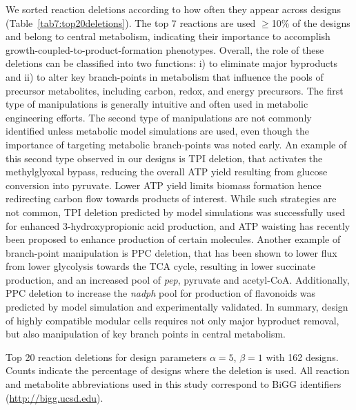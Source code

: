 {We sorted reaction deletions according to how often they appear across designs (Table~\ref{tab7:top20deletions}).
The top 7 reactions are used $\ge$10\% of the designs and belong to central metabolism, indicating their importance to accomplish growth-coupled-to-product-formation phenotypes.
Overall, the role of these deletions can be classified into two functions: i) to eliminate major byproducts and ii) to alter key branch-points in metabolism that influence the pools of precursor metabolites, including carbon, redox, and energy precursors.
The first type of manipulations is generally intuitive and often used in metabolic engineering efforts.\citep{winkler2015}
The second type of manipulations are not commonly identified unless metabolic model simulations are used, \citep{tokuyama2014, venayak2018, chemler2010}
even though the importance of targeting metabolic branch-points was noted early.\citep{stephanopoulos1991}
An example of this second type observed in our designs is TPI deletion, that activates the methylglyoxal bypass,\citep{fong2006} reducing the overall ATP yield resulting from glucose conversion into pyruvate.
Lower ATP yield limits biomass formation hence redirecting carbon flow towards products of interest.
While such strategies are not common, TPI deletion predicted by model simulations was successfully used for enhanced 3-hydroxypropionic acid production,\citep{tokuyama2014} and ATP waisting has recently been proposed to enhance production of certain molecules.\citep{boecker2019}
Another example of branch-point manipulation is PPC deletion, that has been shown to lower flux from lower glycolysis towards the TCA cycle,\citep{de2006,peng2004} resulting in lower succinate production, and an increased pool of \textit{pep}, pyruvate and acetyl-CoA.
Additionally, PPC deletion to increase the \textit{nadph} pool for production of flavonoids was predicted by model simulation and experimentally validated.\citep{chemler2010}
In summary, design of highly compatible modular cells requires not only major byproduct removal, but also manipulation of key branch points in central metabolism.

\begin{table}[h]
    \caption[Top 20 reaction deletions for design parameters $\alpha=5$, $\beta=1$]{Top 20 reaction deletions for design parameters $\alpha=5$, $\beta=1$ with 162 designs. Counts indicate the percentage of designs where the deletion is used. All reaction and metabolite abbreviations used in this study correspond to BiGG identifiers (\protect\url{http://bigg.ucsd.edu}).}
    \centering
    
    \label{tab7:top20deletions}
\end{table}


}
